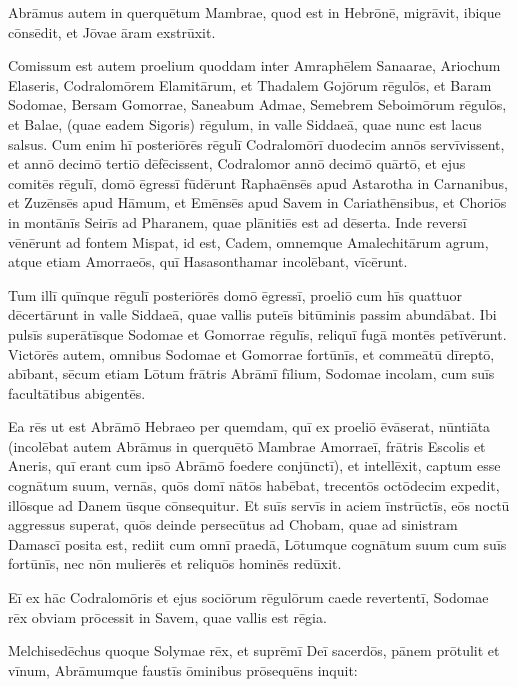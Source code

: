 \Versus Abrāmus autem in querquētum Mambrae, quod est in Hebrōnē, migrāvit, ibique cōnsēdit, et Jōvae āram exstrūxit.



\Caput
\Versus Comissum est autem proelium quoddam inter Amraphēlem Sanaarae, Ariochum Elaseris, Codralomōrem Elamitārum, et Thadalem Gojōrum rēgulōs,
\Versus et Baram Sodomae, Bersam Gomorrae, Saneabum Admae, Semebrem Seboimōrum rēgulōs, et Balae, (quae eadem Sigoris) rēgulum,
\Versus in valle Siddaeā, quae nunc est lacus salsus.
\Versus Cum enim hī posteriōrēs rēgulī Codralomōrī duodecim annōs servīvissent, et annō decimō tertiō dēfēcissent,
\Versus Codralomor annō decimō quārtō, et ejus comitēs rēgulī, domō ēgressī fūdērunt Raphaēnsēs apud Astarotha in Carnanibus, et Zuzēnsēs apud Hāmum, et Emēnsēs apud Savem in Cariathēnsibus,
\Versus et Choriōs in montānīs Seirīs ad Pharanem, quae plānitiēs est ad dēserta.
\Versus Inde reversī vēnērunt ad fontem Mispat, id est, Cadem, omnemque Amalechitārum agrum, atque etiam Amorraeōs, quī Hasasonthamar incolēbant, vīcērunt.

\Versus Tum illī quīnque rēgulī posteriōrēs domō ēgressī,
\Versus proeliō cum hīs quattuor dēcertārunt in valle Siddaeā,
\Versus quae vallis puteīs bitūminis passim abundābat.
\Versus Ibi pulsīs superātīsque Sodomae et Gomorrae rēgulīs, reliquī fugā montēs petīvērunt.
\Versus Victōrēs autem, omnibus Sodomae et Gomorrae fortūnīs, et commeātū dīreptō, abībant,
\Versus sēcum etiam Lōtum frātris Abrāmī fīlium, Sodomae incolam, cum suīs facultātibus abigentēs.

\Versus Ea rēs ut est Abrāmō Hebraeo per quemdam, quī ex proeliō ēvāserat, nūntiāta (incolēbat autem Abrāmus in querquētō Mambrae Amorraeī, frātris Escolis et Aneris, quī erant cum ipsō Abrāmō foedere conjūnctī),
\Versus et intellēxit, captum esse cognātum suum, vernās, quōs domī nātōs habēbat, trecentōs octōdecim expedit, illōsque ad Danem ūsque cōnsequitur.
\Versus Et suīs servīs in aciem īnstrūctīs, eōs noctū aggressus superat, quōs deinde persecūtus ad Chobam, quae ad sinistram Damascī posita est,
\Versus rediit cum omnī praedā, Lōtumque cognātum suum cum suīs fortūnīs, nec nōn mulierēs et reliquōs hominēs redūxit.

\Versus Eī ex hāc Codralomōris et ejus sociōrum rēgulōrum caede revertentī, Sodomae rēx obviam prōcessit in Savem, quae vallis est rēgia.

\Versus Melchisedēchus quoque Solymae rēx, et suprēmī Deī sacerdōs, pānem prōtulit et vīnum,
\Versus Abrāmumque faustīs ōminibus prōsequēns inquit:

